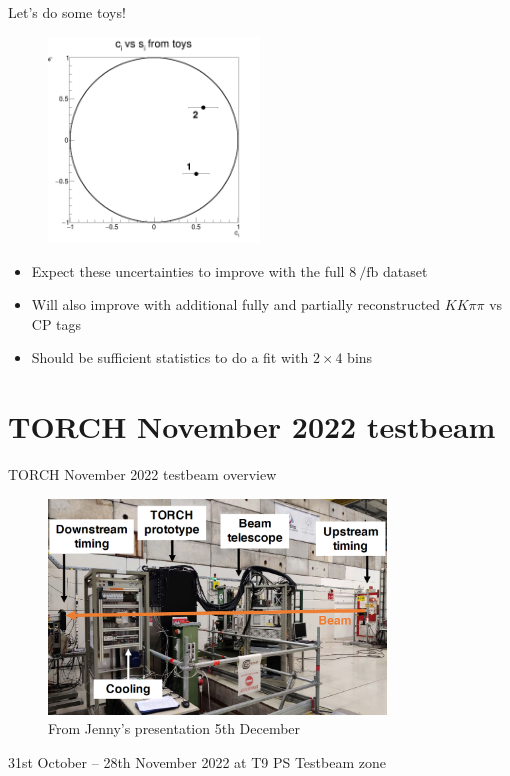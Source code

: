 \documentclass{beamer}
\begin{document}
\begin{frame}{Let's do some toys!}
  \begin{figure}
    \centering
    \includegraphics[width = 0.5\textwidth]{Plots/cisi_toys.png}
  \end{figure}
  \begin{itemize}
    \item{Expect these uncertainties to improve with the full $\SI{8}{\per\femto\barn}$ dataset}
    \item{Will also improve with additional fully and partially reconstructed $KK\pi\pi$ vs CP tags}
    \item{Should be sufficient statistics to do a fit with $2\times4$ bins}
  \end{itemize}
\end{frame}

\section{TORCH November 2022 testbeam}

\begin{frame}{TORCH November 2022 testbeam overview}
  \begin{figure}
    \centering
    \includegraphics[width = 0.8\textwidth]{Plots/TORCH_overview.png}
    \caption{From Jenny's presentation 5th December}
  \end{figure}
  \vspace{-0.5cm}
  \begin{center}
    31st October -- 28th November 2022 at T9 PS Testbeam zone
  \end{center}
\end{frame}
\end{document}
